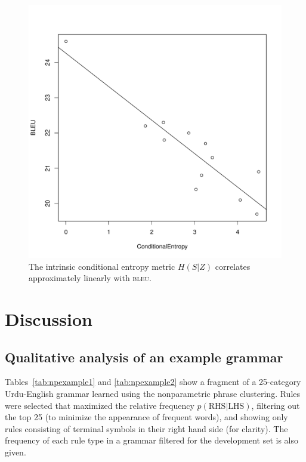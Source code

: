 \begin{figure}
\begin{center}
\includegraphics[scale=0.5]{pyp_clustering/correl.pdf}
\vspace{-0.3cm}
\end{center}
\caption{The intrinsic conditional entropy metric $H(S|Z)$ correlates approximately linearly with \textsc{bleu}.}
\label{fig:intr_correl}
\end{figure}


\section{Discussion}

\subsection{Qualitative analysis of an example grammar}

Tables~\ref{tab:npexample1} and \ref{tab:npexample2} show a fragment of a 25-category Urdu-English grammar learned using the nonparametric phrase clustering.  Rules were selected that maximized the relative frequency $p(\textrm{RHS}|\textrm{LHS})$, filtering out the top 25 (to minimize the appearance of frequent words), and showing only rules consisting of terminal symbols in their right hand side (for clarity). The frequency of each rule type in a grammar filtered for the development set is also given.


